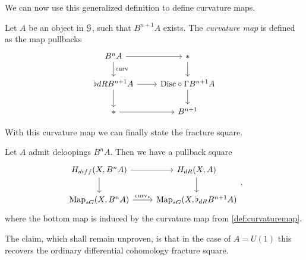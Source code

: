 \documentclass[10pt]{amsart}
\begin{document}

We can now use this generalized definition to define curvature maps.

\begin{definition} \label{def:curvaturemap}
	Let $A$ be an object in $\mathcal{G}$, such that $B^{n+1} A$ exists. The \emph{curvature map} is	defined as the map pullbacks
	\[ 
	\begin{tikzcd}
		B^nA \arrow[r] \arrow[d, "\mathrm{curv}"] & * \arrow[d]  \\
		\flat{dR} B^{n+1} A \arrow[r]  \arrow[d] & \mathrm{Disc} \circ \Gamma  B^{n+1} A \arrow[d] \\ 
		* \arrow[r] & B^{n+1} 
	\end{tikzcd}
	\]
\end{definition}

With this curvature map we can finally state the fracture square.
\begin{theorem}
	Let $A$ admit deloopings $B^n A$. Then we have a pullback square
	\[ 
		\begin{tikzcd}
			H_{diff}(X,B^nA) \arrow[r] \arrow[d] & H_{dR}(X,A) \arrow[d]  \\ 
			\mathrm{Map}_{sG}(X,B^nA) \arrow[r, "\mathrm{curv}_*"] & \mathrm{Map}_{sG}(X, \flat_{dR} B^{n+1} A)
		\end{tikzcd},
		\]
		where the bottom map is induced by the curvature map from \cref{def:curvaturemap}.
	\end{theorem}

The claim, which shall remain unproven, is that in the case of $A = U(1)$ this recovers the ordinary differential cohomology fracture square.

{\footnotesize
 
 
 }
\end{document}

